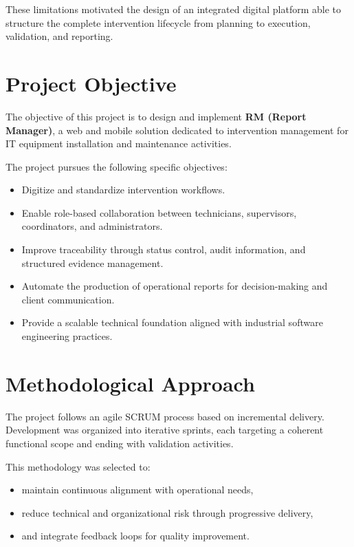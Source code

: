 These limitations motivated the design of an integrated digital platform able to structure the complete intervention lifecycle from planning to execution, validation, and reporting.

\section{Project Objective}

The objective of this project is to design and implement \textbf{RM (Report Manager)}, a web and mobile solution dedicated to intervention management for IT equipment installation and maintenance activities.

The project pursues the following specific objectives:

\begin{itemize}
\item Digitize and standardize intervention workflows.
\item Enable role-based collaboration between technicians, supervisors, coordinators, and administrators.
\item Improve traceability through status control, audit information, and structured evidence management.
\item Automate the production of operational reports for decision-making and client communication.
\item Provide a scalable technical foundation aligned with industrial software engineering practices.
\end{itemize}

\section{Methodological Approach}

The project follows an agile SCRUM process based on incremental delivery. Development was organized into iterative sprints, each targeting a coherent functional scope and ending with validation activities.

This methodology was selected to:

\begin{itemize}
\item maintain continuous alignment with operational needs,
\item reduce technical and organizational risk through progressive delivery,
\item and integrate feedback loops for quality improvement.
\end{itemize}

